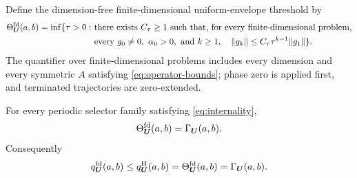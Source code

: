 \documentclass[letterpaper,twoside]{article}
\begin{document}
Define the dimension-free finite-dimensional uniform-envelope threshold by
\begin{equation}\label{eq:fd-envelope-threshold}
\begin{split}
 \Theta^{\rm fd}_{\bm U}(a,b)=\inf\{\tau>0:\ &\text{there exists }C_\tau\ge1
 \text{ such that, for every finite-dimensional problem,}\\
 &\text{every }g_0\ne0,\ \alpha_0>0,\text{ and }k\ge1,\quad
 \lVert g_k\rVert\le C_\tau\tau^{k-1}\lVert g_1\rVert\}.
\end{split}
\end{equation}
The quantifier over finite-dimensional problems includes every dimension and
every symmetric $A$ satisfying \eqref{eq:operator-bounds}; phase zero is
applied first, and terminated trajectories are zero-extended.

\begin{theorem}
\label{thm:fd-envelope-exact}
For every periodic selector family satisfying \eqref{eq:internality},
\begin{equation}\label{eq:fd-envelope-equality}
 \Theta^{\rm fd}_{\bm U}(a,b)=\Gamma_{\bm U}(a,b).
\end{equation}
Consequently
\begin{equation}\label{eq:rate-hierarchy}
 q^{\rm fd}_{\bm U}(a,b)
 \le q^{\rm H}_{\bm U}(a,b)
 =\Theta^{\rm fd}_{\bm U}(a,b)
 =\Gamma_{\bm U}(a,b).
\end{equation}
\end{theorem}
\end{document}
